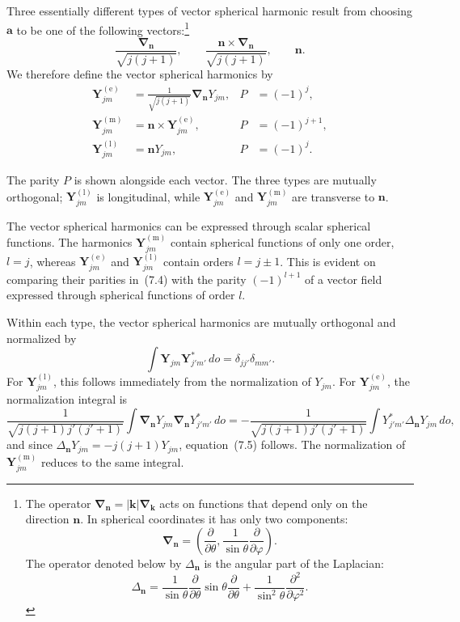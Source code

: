 Three essentially different types of vector spherical harmonic result from choosing $\mathbf a$ to be one of the following vectors:\footnote{The operator $\boldsymbol\nabla_{\mathbf n}=|\mathbf k|\boldsymbol\nabla_{\mathbf k}$ acts on functions that depend only on the direction $\mathbf n$. In spherical coordinates it has only two components:
\[
\boldsymbol\nabla_{\mathbf n}=\left(\frac{\partial}{\partial\theta},
\frac{1}{\sin\theta}\frac{\partial}{\partial\varphi}\right).
\]
The operator denoted below by $\Delta_{\mathbf n}$ is the angular part of the Laplacian:
\[
\Delta_{\mathbf n}=\frac{1}{\sin\theta}\frac{\partial}{\partial\theta}
\sin\theta\frac{\partial}{\partial\theta}
+\frac{1}{\sin^2\theta}\frac{\partial^2}{\partial\varphi^2}.
\]}
\begin{equation}
\frac{\boldsymbol\nabla_{\mathbf n}}{\sqrt{j(j+1)}},
\qquad
\frac{\mathbf n\times\boldsymbol\nabla_{\mathbf n}}{\sqrt{j(j+1)}},
\qquad
\mathbf n.
\tag{7.3}
\end{equation}
We therefore define the vector spherical harmonics by
\begin{equation}
\begin{aligned}
\mathbf Y^{(\text{e})}_{jm}
&=\frac{1}{\sqrt{j(j+1)}}\boldsymbol\nabla_{\mathbf n}Y_{jm},
&P&=(-1)^j,\\
\mathbf Y^{(\text{m})}_{jm}
&=\mathbf n\times\mathbf Y^{(\text{e})}_{jm},
&P&=(-1)^{j+1},\\
\mathbf Y^{(\text{l})}_{jm}
&=\mathbf nY_{jm},
&P&=(-1)^j.
\end{aligned}
\tag{7.4}
\end{equation}

The parity $P$ is shown alongside each vector. The three types are mutually orthogonal; $\mathbf Y^{(\text{l})}_{jm}$ is longitudinal, while $\mathbf Y^{(\text{e})}_{jm}$ and $\mathbf Y^{(\text{m})}_{jm}$ are transverse to $\mathbf n$.

The vector spherical harmonics can be expressed through scalar spherical functions. The harmonics $\mathbf Y^{(\text{m})}_{jm}$ contain spherical functions of only one order, $l=j$, whereas $\mathbf Y^{(\text{e})}_{jm}$ and $\mathbf Y^{(\text{l})}_{jm}$ contain orders $l=j\pm1$. This is evident on comparing their parities in~(7.4) with the parity $(-1)^{l+1}$ of a vector field expressed through spherical functions of order $l$.

Within each type, the vector spherical harmonics are mutually orthogonal and normalized by
\begin{equation}
\int \mathbf Y_{jm}\mathbf Y^*_{j'm'}\,do
=\delta_{jj'}\delta_{mm'}.
\tag{7.5}
\end{equation}
For $\mathbf Y^{(\text{l})}_{jm}$, this follows immediately from the normalization of $Y_{jm}$. For $\mathbf Y^{(\text{e})}_{jm}$, the normalization integral is
\[
\frac{1}{\sqrt{j(j+1)j'(j'+1)}}
\!\int \boldsymbol\nabla_{\mathbf n}Y_{jm}
\boldsymbol\nabla_{\mathbf n}Y^*_{j'm'}\,do
=-\frac{1}{\sqrt{j(j+1)j'(j'+1)}}
\!\int Y^*_{j'm'}\Delta_{\mathbf n}Y_{jm}\,do,
\]
and since $\Delta_{\mathbf n}Y_{jm}=-j(j+1)Y_{jm}$, equation~(7.5) follows. The normalization of $\mathbf Y^{(\text{m})}_{jm}$ reduces to the same integral.

